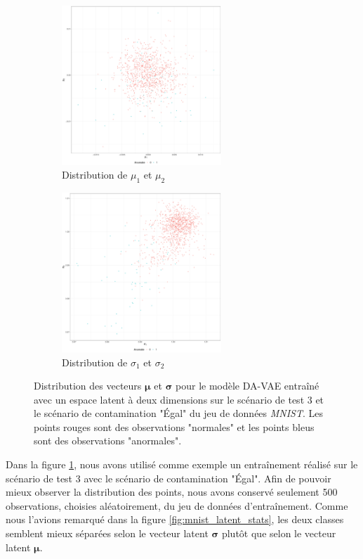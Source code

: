 \begin{figure}[H]
	\centering
	\begin{subfigure}{6cm}
		\centering\includegraphics[width=6cm, height=6cm]{images/latent_stats/mnist_mu_2d}
		\caption{Distribution de $\mu_1$ et $\mu_2$}
	\end{subfigure}
	\begin{subfigure}{6cm}
		\centering\includegraphics[width=6cm, height=6cm]{images/latent_stats/mnist_sigma_2d}
		\caption{Distribution de $\sigma_1$ et $\sigma_2$}
	\end{subfigure}
	\caption[Distribution des vecteurs $\boldsymbol{\mu}$ et $\boldsymbol{\sigma}$ pour le modèle DA-VAE entraîné avec un espace latent à deux dimensions.]{Distribution des vecteurs $\boldsymbol{\mu}$ et $\boldsymbol{\sigma}$ pour le modèle DA-VAE entraîné avec un espace latent à deux dimensions sur le scénario de test 3 et le scénario de contamination "Égal" du jeu de données \textit{MNIST}. Les points rouges sont des observations "normales" et les points bleus sont des observations "anormales".}
	\label{fig:mnist_latent_2d}
\end{figure}

Dans la figure \ref{fig:mnist_latent_2d}, nous avons utilisé comme exemple un entraînement réalisé sur le scénario de test 3 avec le scénario de contamination "Égal". Afin de pouvoir mieux observer la distribution des points, nous avons conservé seulement 500 observations, choisies aléatoirement, du jeu de données d'entraînement. Comme nous l'avions remarqué dans la figure \ref{fig:mnist_latent_stats}, les deux classes semblent mieux séparées selon le vecteur latent $\boldsymbol{\sigma}$ plutôt que selon le vecteur latent $\boldsymbol{\mu}$.

